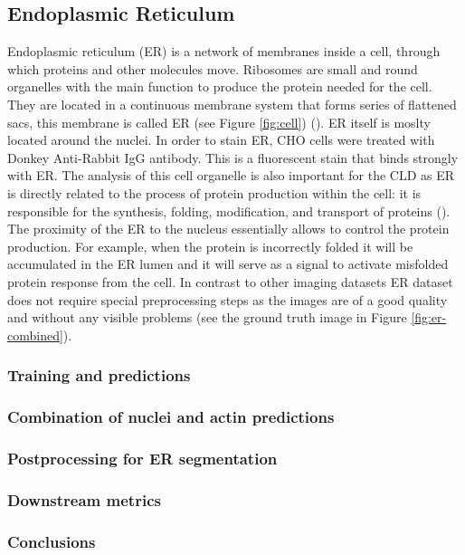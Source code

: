 \subsection{Endoplasmic Reticulum}
    \label{section:er}
    Endoplasmic reticulum (ER) is a network of membranes inside a cell, through which proteins and other molecules move. Ribosomes are small and round organelles with the main function to produce the protein needed for the cell. They are located in a continuous membrane system that forms series of flattened sacs, this membrane is called ER (see Figure \ref{fig:cell}) (\cite{er}). ER itself is moslty located around the nuclei. In order to stain ER, CHO cells were treated with Donkey Anti-Rabbit IgG antibody. This is a fluorescent stain that binds strongly with ER. The analysis of this cell organelle is also important for the CLD as ER is directly related to the process of protein production within the cell: it is responsible for the synthesis, folding, modification, and transport of proteins (\cite{er_2}). The proximity of the ER to the nucleus essentially allows to control the protein production. For example, when the protein is incorrectly folded it will be accumulated in the ER lumen and it will serve as a signal to activate misfolded protein response from the cell. In contrast to other imaging datasets ER dataset does not require special preprocessing steps as the images are of a good quality and without any visible problems (see the ground truth image in Figure \ref{fig:er-combined}).
    
    \subsubsection{Training and predictions}
        
    \subsubsection{Combination of nuclei and actin predictions}
        
    \subsubsection{Postprocessing for ER segmentation}
        
    \subsubsection{Downstream metrics}
        
    \subsubsection{Conclusions}
        
    